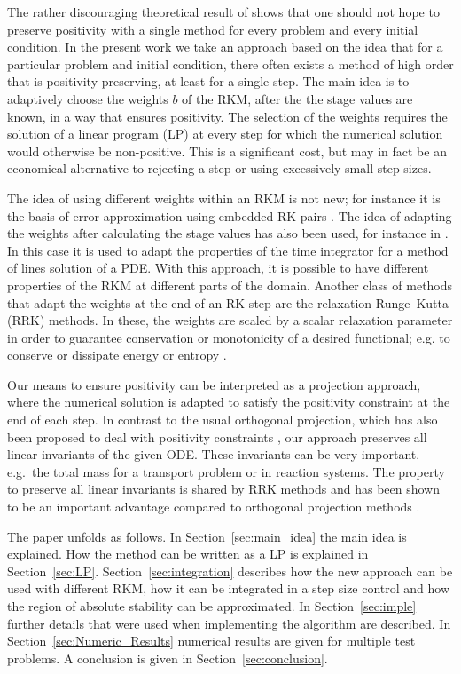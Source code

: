 \documentclass[a4paper]{article}
\numberwithin{equation}{section}
\theoremstyle{plain}
\theoremstyle{definition}
\numberwithin{theorem}{section}
\newcommand{\1}{\mathbbm{1}}
\begin{document}
The rather discouraging theoretical result of \cite{bolley_conservation_1978} shows that one
should not hope to preserve positivity with a single method for every problem and every
initial condition.  In the present work we take an approach based on the idea that for
a particular problem and initial condition, there often exists a method of high order
that is positivity preserving, at least for a single step.
The main idea is to adaptively choose the weights $b$ of the RKM, after the
the stage values are known, in a way that ensures positivity.  
The selection of the weights requires the solution of a linear program (LP) at every
step for which the numerical solution would otherwise be non-positive.
This is a significant cost, but may in fact be an economical alternative to rejecting
a step or using excessively small step sizes.

The idea of using different weights within an RKM is not new; for instance it is
the basis of error approximation using embedded RK pairs \cite{hairer_solving_1993}.
The idea of adapting the weights after calculating the stage values has also been used,
for instance in \cite{ketcheson_spatially_2013}.
In this case it is used to adapt the properties of the time integrator for a method of lines solution of a PDE. With this approach, it is possible to have different properties of the RKM at different parts of the domain. 
Another class of methods that adapt the weights at the end of an RK step
are the relaxation Runge–Kutta (RRK) methods. 
In these, the weights are scaled by a scalar relaxation parameter in order to guarantee
conservation or monotonicity of a desired functional; e.g. to conserve or
dissipate energy or entropy
\cite{ketcheson_relaxation_2019,ranocha_relaxation_2019,ranocha2020general}.

Our means to ensure positivity can be interpreted as a projection
approach, where the numerical solution is adapted to satisfy the
positivity constraint at the end of each step. In contrast to the
usual orthogonal projection, which has also been proposed to deal
with positivity constraints \cite{shampine1986conservation},
our approach preserves all linear invariants of the given ODE. These
invariants can be very important. e.g.\ the total mass for a transport
problem or in reaction systems. The property to preserve all linear
invariants is shared by RRK methods and has been shown to be an
important advantage compared to orthogonal projection methods
\cite{ranocha2020relaxationHamiltonian}.

The paper unfolds as follows. In Section~\ref{sec:main_idea} the main idea is explained. How the method can be written as a LP is explained in Section~\ref{sec:LP}.
Section~\ref{sec:integration} describes how the new approach can be used with different RKM, how it can be integrated in a step size control and how the region of absolute stability can be approximated.
In Section~\ref{sec:imple} further details that were used when implementing the algorithm are described.
In Section~\ref{sec:Numeric_Results} numerical results are given for multiple test problems.
A conclusion is given in Section~\ref{sec:conclusion}.
\end{document}
